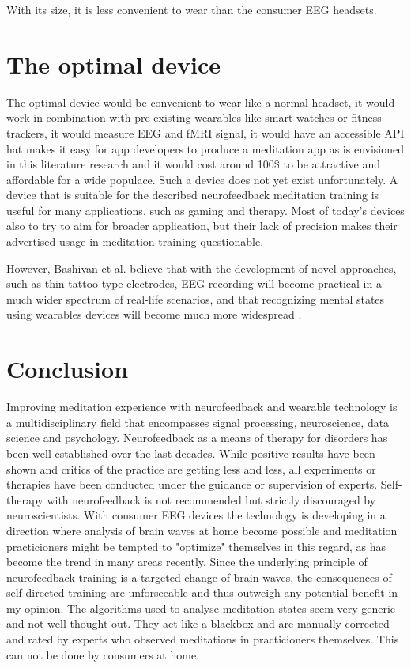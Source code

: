 \documentclass{llncs} %
\begin{document}
With its size, it is less convenient to wear than the consumer EEG headsets.
\section{The optimal device}
The optimal device would be convenient to wear like a normal headset, it would work in combination with pre existing wearables like smart watches or fitness trackers, it would measure EEG and fMRI signal, it would have an accessible API hat makes it easy for app developers to produce a meditation app as is envisioned in this literature research and it would cost around 100\$ to be attractive and affordable for a wide populace. Such a device does not yet exist unfortunately. A device that is suitable for the described neurofeedback meditation training is useful for many applications, such as gaming and therapy. Most of today's devices also to try to aim for broader application, but their lack of precision makes their advertised usage in meditation training questionable. 
\medskip

However, Bashivan et al. believe that with the development of novel approaches, such as thin tattoo-type electrodes, EEG recording will become practical in a much wider spectrum of real-life scenarios, and that recognizing mental states using wearables devices will become much more widespread \cite{Bashivan: et al}. 
\section{Conclusion}
Improving meditation experience with neurofeedback and wearable technology is a multidisciplinary field that encompasses signal processing, neuroscience, data science and psychology. Neurofeedback as a means of therapy for disorders has been well established over the last decades. While positive results have been shown and critics of the practice are getting less and less, all experiments or therapies have been conducted under the guidance or supervision of experts. Self-therapy with neurofeedback is not recommended but strictly discouraged by neuroscientists. With consumer EEG devices the technology is developing in a direction where analysis of brain waves at home become possible and meditation practicioners might be tempted to "optimize" themselves in this regard, as has become the trend in many areas recently. Since the underlying principle of neurofeedback training is a targeted change of brain waves, the consequences of self-directed training are unforseeable and thus outweigh any potential benefit in my opinion. The algorithms used to analyse meditation states seem very generic and not well thought-out. They act like a blackbox and are manually corrected and rated by experts who observed meditations in practicioners themselves. This can not be done by consumers at home. 
\medskip
\end{document}
